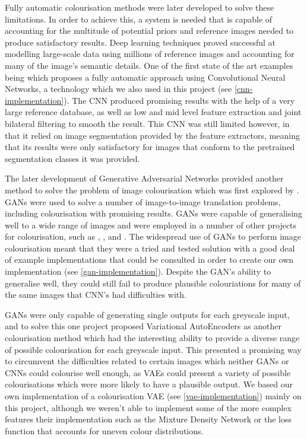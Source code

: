\documentclass{l4proj}
\begin{document}
Fully automatic colourisation methods were later developed to solve these limitations. In order to achieve this, a system is needed that is capable of accounting for the multitude of potential priors and reference images needed to produce satisfactory results. Deep learning techniques proved successful at modelling large-scale data using millions of reference images and accounting for many of the image's semantic details. One of the first state of the art examples being \cite{DeepColorization} which proposes a fully automatic approach using Convolutional Neural Networks, a technology which we also used in this project (see \ref{cnn-implementation}). The CNN produced promising results with the help of a very large reference database, as well as low and mid level feature extraction and joint bilateral filtering to smooth the result. This CNN was still limited however, in that it relied on image segmentation provided by the feature extractors, meaning that its results were only satisfactory for images that conform to the pretrained segmentation classes it was provided. 

The later development of Generative Adversarial Networks provided another method to solve the problem of image colourisation which was first explored by \cite{ImageToImage}. GANs were used to solve a number of image-to-image translation problems, including colourisation with promising results. GANs were capable of generalising well to a wide range of images and were employed in a number of other projects for colourisation, such as \cite{MetalGAN}, \cite{DCGAN}, and \cite{GANColorization}. The widespread use of GANs to perform image colourisation meant that they were a tried and tested solution with a good deal of example implementations that could be consulted in order to create our own implementation (see \ref{gan-implementation}). Despite the GAN's ability to generalise well, they could still fail to produce plausible colouriations for many of the same images that CNN's had difficulties with.  

GANs were only capable of generating single outputs for each greyscale input, and to solve this one project \cite{DiverseColorization} proposed Variational AutoEncoders as another colourisation method which had the interesting ability to provide a diverse range of possible colourisation for each greyscale input. This presented a promising way to circumvent the difficulties related to certain images which neither GANs or CNNs could colourise well enough, as VAEs could present a variety of possible colourisations which were more likely to have a plausible output. We based our own implementation of a colourisation VAE (see \ref{vae-implementation}) mainly on this project, although we weren't able to implement some of the more complex features their implementation such as the Mixture Density Network or the loss function that accounts for uneven colour distributions.
\end{document}
